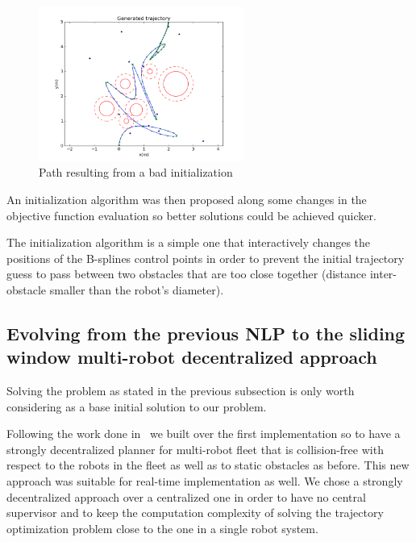 \begin{figure}[!h]
	\centering
	\includegraphics[width=0.6\textwidth]{./images/planning-sim-trajc.png}
	\caption{Path resulting from a bad initialization\label{fig:planning-sim-trajc}}
\end{figure}

An initialization algorithm was then proposed along some changes in the objective function evaluation so better solutions could be achieved quicker.

The initialization algorithm is a simple one that interactively changes the positions of the B-splines control points in order to prevent the initial trajectory guess to pass between two obstacles that are too close together (distance inter-obstacle smaller than the robot's diameter).

\subsection{Evolving from the previous NLP to the sliding window multi-robot decentralized approach}

Solving the problem as stated in the previous subsection is only worth considering as a base initial solution to our problem.

Following the work done in~\cite{Defoort2007a} we built over the first implementation so to have a strongly decentralized planner for multi-robot fleet that is collision-free with respect to the robots in the fleet as well as to static obstacles as before. This new approach was suitable for real-time implementation as well. We chose a strongly decentralized approach over a centralized one in order to have no central supervisor and to keep the computation complexity of solving the trajectory optimization problem close to the one in a single robot system.

